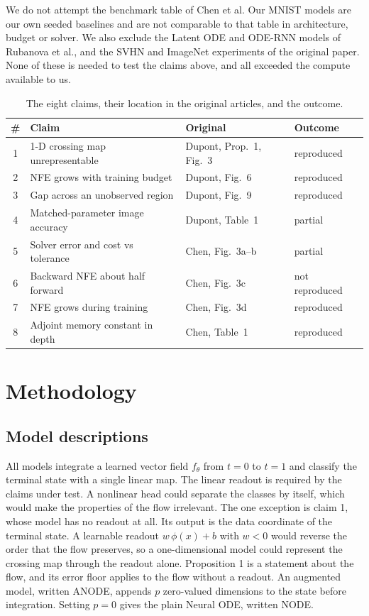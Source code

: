 We do not attempt the benchmark table of Chen et al. Our MNIST models are our own seeded
baselines and are not comparable to that table in architecture, budget or solver. We also
exclude the Latent ODE and ODE-RNN models of Rubanova et
al.\supercite{rubanova2019latent}, and the SVHN and ImageNet experiments of the original
paper. None of these is needed to test the claims above, and all exceeded the compute
available to us.

\begin{table}[h]
  \centering
  \small
  \caption{The eight claims, their location in the original articles, and the outcome.}
  \label{tab:claims}
  \begin{tabular}{@{}clll@{}}
    \toprule
    \# & Claim & Original & Outcome \\
    \midrule
    1 & 1-D crossing map unrepresentable & Dupont, Prop.~1, Fig.~3 & reproduced \\
    2 & NFE grows with training budget   & Dupont, Fig.~6         & reproduced \\
    3 & Gap across an unobserved region  & Dupont, Fig.~9         & reproduced \\
    4 & Matched-parameter image accuracy & Dupont, Table~1        & partial \\
    5 & Solver error and cost vs tolerance & Chen, Fig.~3a--b     & partial \\
    6 & Backward NFE about half forward  & Chen, Fig.~3c          & not reproduced \\
    7 & NFE grows during training        & Chen, Fig.~3d          & reproduced \\
    8 & Adjoint memory constant in depth & Chen, Table~1          & reproduced \\
    \bottomrule
  \end{tabular}
\end{table}

\section{Methodology}
\label{sec:methods}

\subsection{Model descriptions}

All models integrate a learned vector field $f_\theta$ from $t=0$ to $t=1$ and classify the
terminal state with a single linear map. The linear readout is required by the claims under
test. A nonlinear head could separate the classes by itself, which would make the properties
of the flow irrelevant. The one exception is claim 1, whose model has no readout at all. Its
output is the data coordinate of the terminal state. A learnable readout $w\,\phi(x)+b$ with
$w<0$ would reverse the order that the flow preserves, so a one-dimensional model could
represent the crossing map through the readout alone. Proposition 1 is a statement about the
flow, and its error floor applies to the flow without a readout. An augmented model, written ANODE, appends $p$ zero-valued dimensions
to the state before integration. Setting $p=0$ gives the plain Neural ODE, written NODE.

